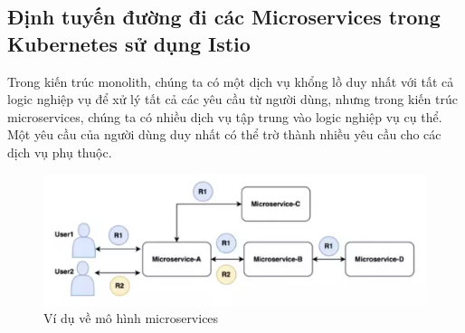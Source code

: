 \documentclass[12pt,a4paper]{report}
\begin{document}
		\subsection{Định tuyến đường đi các Microservices trong Kubernetes sử dụng Istio}
			\hspace{0.6cm} Trong kiến trúc monolith, chúng ta có một dịch vụ khổng lồ duy nhất với tất cả logic nghiệp vụ để xử lý tất cả các yêu cầu từ người dùng, nhưng trong kiến trúc microservices, chúng ta có nhiều dịch vụ tập trung vào logic nghiệp vụ cụ thể. Một yêu cầu của người dùng duy nhất có thể trờ thành nhiều yêu cầu cho các dịch vụ phụ thuộc.
			
			\begin{figure}[h!]
				\centering
				\includegraphics[width=0.9\linewidth]{Pics/2.2.2-p4}
				\caption{Ví dụ về mô hình microservices}
				\label{fig:2}
			\end{figure}
		
\end{document}
